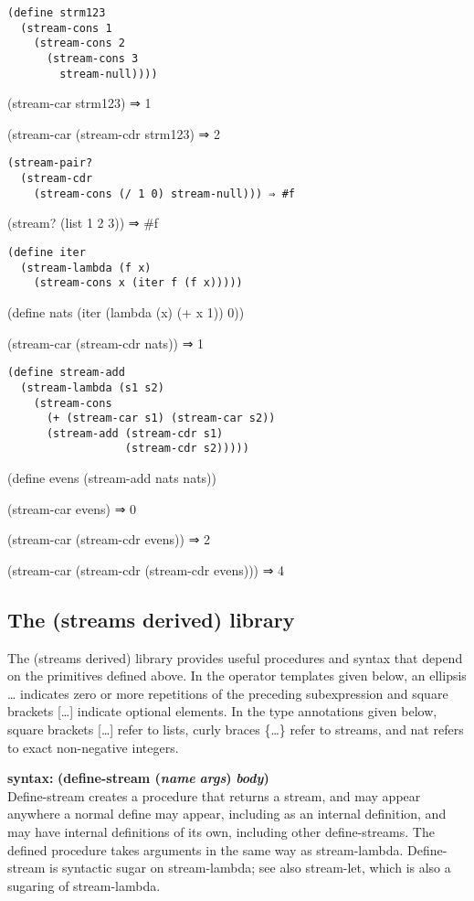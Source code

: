 \begin{verbatim}
(define strm123
  (stream-cons 1
    (stream-cons 2
      (stream-cons 3
        stream-null))))
\end{verbatim}

(stream-car strm123) ⇒ 1

(stream-car (stream-cdr strm123) ⇒ 2

\begin{verbatim}
(stream-pair?
  (stream-cdr
    (stream-cons (/ 1 0) stream-null))) ⇒ #f
\end{verbatim}

(stream? (list 1 2 3)) ⇒ \#f

\begin{verbatim}
(define iter
  (stream-lambda (f x)
    (stream-cons x (iter f (f x)))))
\end{verbatim}

(define nats (iter (lambda (x) (+ x 1)) 0))

(stream-car (stream-cdr nats)) ⇒ 1

\begin{verbatim}
(define stream-add
  (stream-lambda (s1 s2)
    (stream-cons
      (+ (stream-car s1) (stream-car s2))
      (stream-add (stream-cdr s1)
                  (stream-cdr s2)))))
\end{verbatim}

(define evens (stream-add nats nats))

(stream-car evens) ⇒ 0

(stream-car (stream-cdr evens)) ⇒ 2

(stream-car (stream-cdr (stream-cdr evens))) ⇒ 4

\subsection{The (streams derived)
library}\label{the-streams-derived-library}

The (streams derived) library provides useful procedures and syntax that
depend on the primitives defined above. In the operator templates given
below, an ellipsis \ldots{} indicates zero or more repetitions of the
preceding subexpression and square brackets {[}\ldots{}{]} indicate
optional elements. In the type annotations given below, square brackets
{[}\ldots{}{]} refer to lists, curly braces \{\ldots{}\} refer to
streams, and nat refers to exact non-negative integers.

\textbf{syntax:} \textbf{(define-stream (\emph{name}} \textbf{}
\textbf{\emph{args})} \textbf{\emph{body})}\\
Define-stream creates a procedure that returns a stream, and may appear
anywhere a normal define may appear, including as an internal
definition, and may have internal definitions of its own, including
other define-streams. The defined procedure takes arguments in the same
way as stream-lambda. Define-stream is syntactic sugar on stream-lambda;
see also stream-let, which is also a sugaring of stream-lambda.

